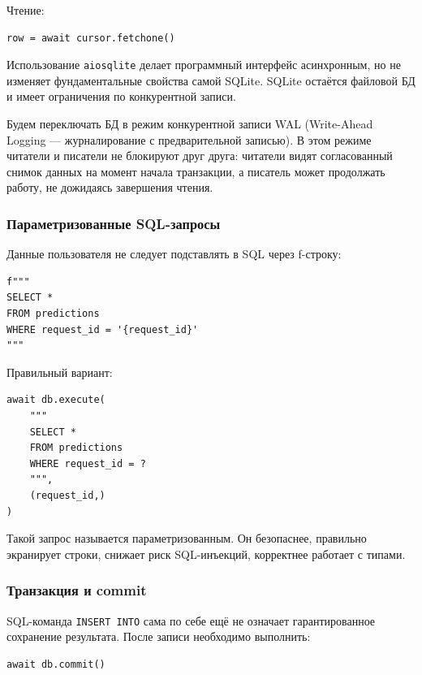 \documentclass[12pt,a4paper]{article}
\begin{document}
Чтение:

\begin{lstlisting}[caption={Чтение одной строки}]
row = await cursor.fetchone()
\end{lstlisting}

Использование \texttt{aiosqlite} делает программный интерфейс асинхронным, но не изменяет фундаментальные свойства самой SQLite. SQLite остаётся файловой БД и имеет ограничения по конкурентной записи.

Будем переключать БД в режим конкурентной записи WAL (Write-Ahead Logging — журналирование с предварительной записью). В этом режиме читатели и писатели не блокируют друг друга: читатели видят согласованный снимок данных на момент начала транзакции, а писатель может продолжать работу, не дожидаясь завершения чтения.

\subsubsection{Параметризованные SQL-запросы}

Данные пользователя не следует подставлять в SQL через f-строку:

\begin{lstlisting}[caption={Небезопасный SQL}]
f"""
SELECT *
FROM predictions
WHERE request_id = '{request_id}'
"""
\end{lstlisting}

Правильный вариант:

\begin{lstlisting}[caption={Параметризованный SQL}]
await db.execute(
    """
    SELECT *
    FROM predictions
    WHERE request_id = ?
    """,
    (request_id,)
)
\end{lstlisting}

Такой запрос называется параметризованным. Он безопаснее, правильно экранирует строки, снижает риск SQL-инъекций, корректнее работает с типами.

\subsubsection{Транзакция и commit}

SQL-команда \texttt{INSERT INTO} сама по себе ещё не означает гарантированное сохранение результата. После записи необходимо выполнить:

\begin{lstlisting}[caption={Фиксация одиночной записи}]
await db.commit()
\end{lstlisting}
\end{document}
